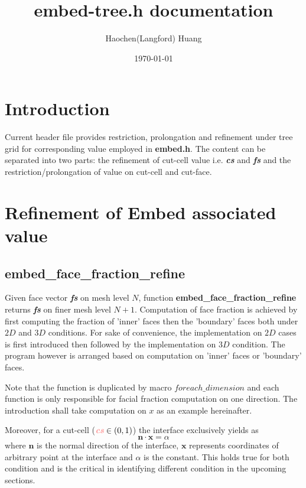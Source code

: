 \documentclass[a4paper]{article}
\title{embed-tree.h documentation}
\author{Haochen(Langford) Huang}
\date{\today}
\newcommand{\func}[1]{\textbf{\textcolor{function}{#1}}}
\newcommand{\para}[1]{\textbf{\emph{\textcolor{para}{#1}}}}
\begin{document}
\maketitle
\section{Introduction}
Current header file provides restriction, prolongation and refinement under tree grid for corresponding value employed in \textbf{embed.h}. The content can be separated into two parts: the refinement of cut-cell value i.e. \para{cs} and \para{fs} and the restriction/prolongation of value on cut-cell and cut-face.

\section{Refinement of Embed associated value}
\subsection{\func{embed\_face\_fraction\_refine}}
Given face vector \para{fs} on mesh level $N$, function \func{embed\_face\_fraction\_refine} returns \para{fs} on finer mesh level $N+1$. Computation of face fraction is achieved by first computing the fraction of 'inner' faces then the 'boundary' faces both under $2D$ and $3D$ conditions. For sake of convenience, the implementation on $2D$ cases is first introduced then followed by the implementation on $3D$ condition. The program however is arranged based on computation on 'inner' faces or 'boundary' faces.\par
Note that the function is duplicated by macro $foreach\_dimension$ and each function is only responsible for facial fraction computation on one direction. The introduction shall take computation on $x$ as an example hereinafter.\par
Moreover, for a cut-cell ($\para{cs} \in (0,1)$) the interface exclusively yields as 
\begin{equation}\label{equ:interface}
    \mathbf{n}\cdot\mathbf{x} = \alpha
\end{equation}
where $\mathbf{n}$ is the normal direction of the interface, $\mathbf{x}$ represents coordinates of arbitrary point at the interface and $\alpha$ is the constant. This holds true for both condition and is the critical in identifying different condition in the upcoming sections.
\end{document}
